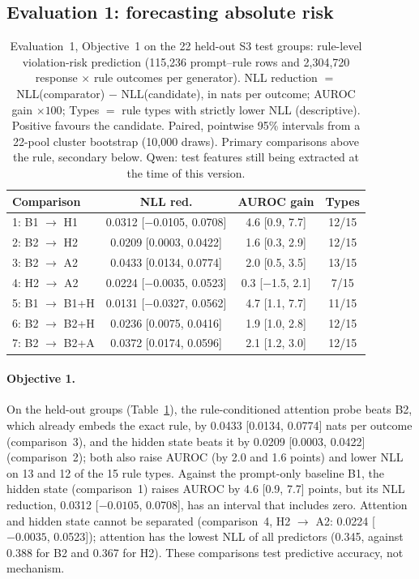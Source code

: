\documentclass{article}
\newcommand{\cto}{$\rightarrow$}
\begin{document}
\subsection{Evaluation 1: forecasting absolute risk}
\label{sec:results}

\begin{table}[t]
\centering\footnotesize
\caption{Evaluation~1, Objective~1 on the 22 held-out S3 test groups: rule-level violation-risk prediction (115,236 prompt--rule rows and 2,304,720 response $\times$ rule outcomes per generator). NLL reduction $=$ NLL(comparator) $-$ NLL(candidate), in nats per outcome; AUROC gain $\times100$; Types $=$ rule types with strictly lower NLL (descriptive). Positive favours the candidate. Paired, pointwise 95\% intervals from a 22-pool cluster bootstrap (10,000 draws). Primary comparisons above the rule, secondary below. Qwen: test features still being extracted at the time of this version.}
\label{tab:e1o1}
\begin{tabular}{lccc}
\toprule
Comparison & NLL red. & AUROC gain & Types \\
\midrule
1: B1 \cto{} H1 & 0.0312 [$-$0.0105, 0.0708] & 4.6 [0.9, 7.7] & 12/15 \\
2: B2 \cto{} H2 & 0.0209 [0.0003, 0.0422] & 1.6 [0.3, 2.9] & 12/15 \\
3: B2 \cto{} A2 & 0.0433 [0.0134, 0.0774] & 2.0 [0.5, 3.5] & 13/15 \\
4: H2 \cto{} A2 & 0.0224 [$-$0.0035, 0.0523] & 0.3 [$-$1.5, 2.1] & 7/15 \\
\midrule
5: B1 \cto{} B1+H & 0.0131 [$-$0.0327, 0.0562] & 4.7 [1.1, 7.7] & 11/15 \\
6: B2 \cto{} B2+H & 0.0236 [0.0075, 0.0416] & 1.9 [1.0, 2.8] & 12/15 \\
7: B2 \cto{} B2+A & 0.0372 [0.0174, 0.0596] & 2.1 [1.2, 3.0] & 12/15 \\
\bottomrule
\end{tabular}
\end{table}



\paragraph{Objective 1.} On the held-out groups (Table~\ref{tab:e1o1}), the rule-conditioned attention probe
beats B2, which already embeds the exact rule, by 0.0433 [0.0134, 0.0774] nats per outcome (comparison~3),
and the hidden state beats it by 0.0209 [0.0003, 0.0422] (comparison~2); both also raise AUROC (by 2.0 and 1.6 points) and
lower NLL on 13 and 12 of the 15 rule types. Against the prompt-only baseline B1, the hidden state (comparison~1) raises
AUROC by 4.6 [0.9, 7.7] points, but its NLL reduction, 0.0312 [$-0.0105$, 0.0708], has an interval that includes zero.
Attention and hidden state cannot be separated (comparison~4, H2 \cto{} A2: 0.0224 [$-0.0035$, 0.0523]); attention has the lowest NLL of
all predictors (0.345, against 0.388 for B2 and 0.367 for H2). These comparisons test predictive accuracy, not
mechanism.
\end{document}
